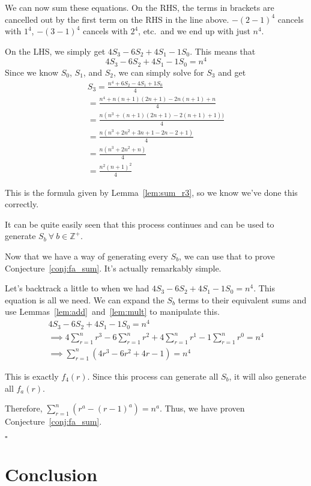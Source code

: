 \documentclass[a4paper]{article}
\newcommand{\sn}{\sum\limits_{r=1}^{n}}
\newcommand{\zp}{\mathbb{Z}^+}
\begin{document}
We can now sum these equations. On the RHS, the terms in brackets are cancelled out by the first term on the RHS in the line above. $-(2-1)^4$ cancels with $1^4$, $-(3-1)^4$ cancels with $2^4$, etc.\ and we end up with just $n^4$.

On the LHS, we simply get $4S_3 - 6S_2 + 4S_1 - 1S_0$. This means that $$4S_3 - 6S_2 + 4S_1 - 1S_0 = n^4$$ Since we know $S_0$, $S_1$, and $S_2$, we can simply solve for $S_3$ and get
\begin{gather*}
S_3 = \frac{n^4 + 6S_2 - 4S_1 + 1S_0}{4}\\[0.5em]
= \frac{n^4 + n(n+1)(2n+1) - 2n(n+1) + n}{4}\\[0.5em]
= \frac{n(n^3 + (n+1)(2n+1) - 2(n+1) + 1))}{4}\\[0.5em]
= \frac{n(n^3 + 2n^2 + 3n + 1 - 2n - 2 + 1)}{4}\\[0.5em]
= \frac{n(n^3 + 2n^2 + n)}{4}\\[0.5em]
= \frac{n^2(n+1)^2}{4}
\end{gather*}

This is the formula given by Lemma~\ref{lem:sum_r3}, so we know we've done this correctly.

It can be quite easily seen that this process continues and can be used to generate $S_b\ \forall\ b \in \zp$.

Now that we have a way of generating every $S_b$, we can use that to prove Conjecture~\ref{conj:fa_sum}. It's actually remarkably simple.

Let's backtrack a little to when we had $4S_3 - 6S_2 + 4S_1 - 1S_0 = n^4$. This equation is all we need. We can expand the $S_b$ terms to their equivalent sums and use Lemmas~\ref{lem:add}~and~\ref{lem:mult} to manipulate this.
\begin{gather*}
4S_3 - 6S_2 + 4S_1 - 1S_0 = n^4\\[0.5em]
\implies 4 \sn r^3 - 6 \sn r^2 + 4 \sn r^1 - 1 \sn r^0 = n^4\\[0.5em]
\implies \sn (4r^3 - 6r^2 + 4r - 1) = n^4
\end{gather*}

This is exactly $f_4(r)$. Since this process can generate all $S_b$, it will also generate all $f_a(r)$.

Therefore, $\sn (r^a - (r-1)^a) = n^a$. Thus, we have proven Conjecture~\ref{conj:fa_sum}.

\hspace*{\fill}$\square$

\section{Conclusion}
\end{document}

